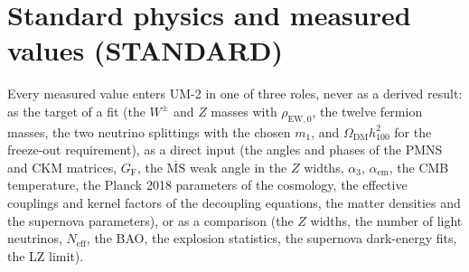 \documentclass[
  10pt,
]{article}
\begin{document}
\hypertarget{standard-physics-and-measured-values-standard}{%
\section{Standard physics and measured values
(STANDARD)}\label{standard-physics-and-measured-values-standard}}

Every measured value enters UM-2 in one of three roles, never as a
derived result: as the target of a fit (the \(W^\pm\) and \(Z\) masses
with \(\rho_{\mathrm{EW},0}\), the twelve fermion masses, the two
neutrino splittings with the chosen \(m_1\), and
\(\Omega_{\mathrm{DM}}h_{100}^2\) for the freeze-out requirement), as a
direct input (the angles and phases of the PMNS and CKM matrices,
\(G_{\mathrm{F}}\), the \(\overline{\mathrm{MS}}\) weak angle in the
\(Z\) widths, \(\alpha_3\), \(\alpha_{\mathrm{em}}\), the CMB
temperature, the Planck 2018 parameters of the cosmology, the effective
couplings and kernel factors of the decoupling equations, the matter
densities and the supernova parameters), or as a comparison (the \(Z\)
widths, the number of light neutrinos, \(N_{\mathrm{eff}}\), the BAO,
the explosion statistics, the supernova dark-energy fits, the LZ limit).
\end{document}
